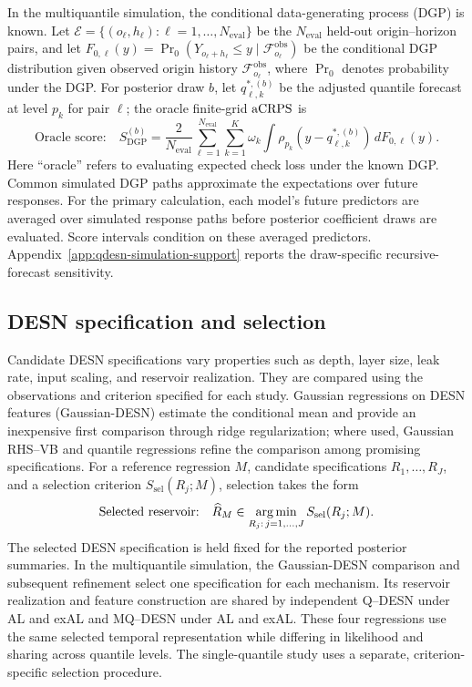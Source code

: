 In the multiquantile simulation, the conditional data-generating process
(DGP) is known. Let
\(\mathcal E=\{(o_\ell,h_\ell):\ell=1,\ldots,N_{\mathrm{eval}}\}\)
be the \(N_{\mathrm{eval}}\) held-out origin--horizon pairs, and let
\(F_{0,\ell}(y)=\Pr_0(Y_{o_\ell+h_\ell}\le y
\mid\mathcal F_{o_\ell}^{\mathrm{obs}})\)
be the conditional DGP distribution given observed origin history
\(\mathcal F_{o_\ell}^{\mathrm{obs}}\), where \(\Pr_0\) denotes probability
under the DGP. For posterior draw \(b\), let \(q_{\ell,k}^{*,(b)}\) be the
adjusted quantile forecast at level \(p_k\) for pair \(\ell\); the oracle
finite-grid \(\operatorname{aCRPS}\) is
\begin{equation}
\text{Oracle score:}\quad S_{\mathrm{DGP}}^{(b)}
=\frac{2}{N_{\mathrm{eval}}}\sum_{\ell=1}^{N_{\mathrm{eval}}}
\sum_{k=1}^K\omega_k
\int\rho_{p_k}\!\left(y-q_{\ell,k}^{*,(b)}\right)\,dF_{0,\ell}(y).
\label{qdesn2026:eq:dgp-integrated-score-main}
\end{equation}
Here ``oracle'' refers to evaluating expected check loss under the known DGP.
Common simulated DGP paths approximate the expectations over future
responses. For the primary calculation, each model's future predictors are
averaged over simulated response paths before posterior coefficient draws
are evaluated. Score intervals condition on these averaged predictors.
Appendix~\ref{app:qdesn-simulation-support} reports the draw-specific
recursive-forecast sensitivity.

\subsection{DESN specification and selection}
\label{qdesn2026:sec:selection}

Candidate DESN specifications vary properties such as depth, layer size,
leak rate, input scaling, and reservoir realization. They are compared using
the observations and criterion specified for each study. Gaussian regressions
on DESN features (Gaussian-DESN) estimate the
conditional mean and provide an inexpensive first comparison through ridge
regularization; where used, Gaussian RHS--VB and quantile
regressions refine the comparison among promising specifications. For a
reference regression \(M\), candidate specifications \(R_1,\ldots,R_J\),
and a selection criterion \(S_{\mathrm{sel}}(R_j;M)\), selection takes
the form
\begin{equation}
\text{Selected reservoir:}\quad \widehat R_M
\in\operatorname*{arg\,min}_{R_j:\,j=1,\ldots,J}
S_{\mathrm{sel}}(R_j;M).
\label{qdesn2026:eq:reservoir-selection-main}
\end{equation}
The selected DESN specification is held fixed for the reported posterior
summaries. In the
multiquantile simulation, the Gaussian-DESN comparison and subsequent refinement select
one specification for each mechanism. Its reservoir realization and feature
construction are shared by independent Q--DESN under AL and exAL and
MQ--DESN under AL and exAL. These four regressions
use the same selected temporal representation while differing in likelihood
and sharing across quantile levels. The single-quantile study uses a separate,
criterion-specific selection procedure.

